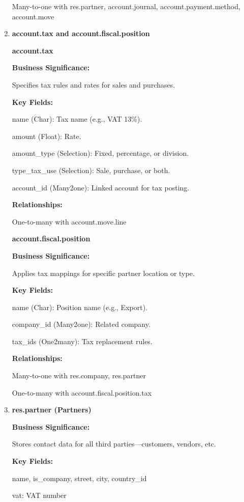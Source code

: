 \documentclass[11pt,a4paper]{article}
\begin{document}
\begin{enumerate}
    Many-to-one with res.partner, account.journal, account.payment.method, account.move

    \item \textbf{account.tax and account.fiscal.position}
    
    \textbf{account.tax}
    
    \textbf{Business Significance:}

    Specifies tax rules and rates for sales and purchases.
    \medskip

    \textbf{Key Fields:}

    name (Char): Tax name (e.g., VAT 13\%).

    amount (Float): Rate.

    amount\_type (Selection): Fixed, percentage, or division.

    type\_tax\_use (Selection): Sale, purchase, or both.

    account\_id (Many2one): Linked account for tax posting.
    \medskip

    \textbf{Relationships:}

    One-to-many with account.move.line
    \medskip

    \textbf{account.fiscal.position}
    
    \textbf{Business Significance:}

    Applies tax mappings for specific partner location or type. 
    \medskip

    \textbf{Key Fields:}

    name (Char): Position name (e.g., Export). 

    company\_id (Many2one): Related company.

    tax\_ids (One2many): Tax replacement rules.
    \medskip

    \textbf{Relationships:}

    Many-to-one with res.company, res.partner

    One-to-many with account.fiscal.position.tax

    \item \textbf{res.partner (Partners)}
    
    \textbf{Business Significance:}

    Stores contact data for all third parties—customers, vendors, etc.
    \medskip

    \textbf{Key Fields:}

    name, is\_company, street, city, country\_id

    vat: VAT number


\end{enumerate}
\end{document}
